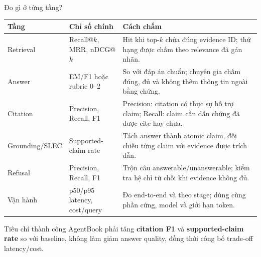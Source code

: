 \documentclass[aspectratio=169,11pt]{beamer}
\newcommand{\keyword}[1]{\textcolor{ABBlue}{\textbf{#1}}}
\begin{document}
\begin{frame}{Đo gì ở từng tầng?}
\scriptsize
\begin{tabularx}{\textwidth}{L{0.18\textwidth}L{0.28\textwidth}Y}
\toprule
\textbf{Tầng} & \textbf{Chỉ số chính} & \textbf{Cách chấm} \\
\midrule
Retrieval & Recall@$k$, MRR, nDCG@$k$ & Hit khi top-$k$ chứa đúng evidence ID; thứ hạng được chấm theo relevance đã gán nhãn. \\
Answer & EM/F1 hoặc rubric 0--2 & So với đáp án chuẩn; chuyên gia chấm đúng, đủ và không thêm thông tin ngoài bằng chứng. \\
Citation & Precision, Recall, F1 & Precision: citation có thực sự hỗ trợ claim; Recall: claim cần dẫn chứng đã được cite hay chưa. \\
Grounding/SLEC & Supported-claim rate & Tách answer thành atomic claim, đối chiếu từng claim với evidence được trích dẫn. \\
Refusal & Precision, Recall, F1 & Trộn câu answerable/unanswerable; kiểm tra hệ chỉ từ chối khi evidence không đủ. \\
Vận hành & p50/p95 latency, cost/query & Đo end-to-end và theo stage; dùng cùng phần cứng, model và giới hạn token. \\
\bottomrule
\end{tabularx}
\vspace{0.18cm}
\begin{block}{Tiêu chí thành công}
AgentBook phải tăng \keyword{citation F1} và \keyword{supported-claim rate} so với baseline, không làm giảm answer quality, đồng thời công bố trade-off latency/cost.
\end{block}
\end{frame}
\end{document}

